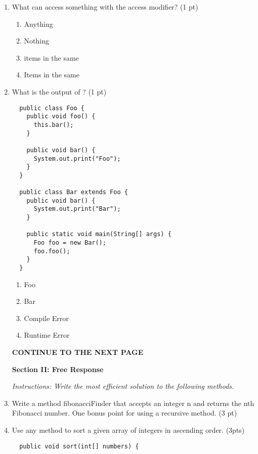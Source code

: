 \documentclass[11pt,fleqn]{article}
\begin{document}
\begin{enumerate}
\item What can access something with the  access modifier? (1 pt)
	\begin{enumerate}
	\item Anything
	\item Nothing
	\item items in the same 
	\item Items in the same  %
	\end{enumerate}

\item What is the output of ? (1 pt)
  \begin{verbatim}
  public class Foo {
    public void foo() {
      this.bar();
    }

    public void bar() {
      System.out.print("Foo");
    }
  }

  public class Bar extends Foo {
    public void bar() {
      System.out.print("Bar");
    }

    public static void main(String[] args) {
      Foo foo = new Bar();
      foo.foo();
    }
  }
  \end{verbatim}
	\begin{enumerate}
	\item Foo
	\item Bar
	\item Compile Error
	\item Runtime Error
	\end{enumerate}

  \vfill
  \begin{center}
  \textbf{CONTINUE TO THE NEXT PAGE}
  \end{center}

	\newpage

  \begin{center}
  \begin{large}
    \textbf{Section II: Free Response}
  \end{large}
  \end{center}
  \textit{Instructions: Write the most efficient solution to the following methods.}

\item Write a method fibonacciFinder that accepts an integer n and returns the nth Fibonacci number. One bonus point for using a recursive method. (3 pt)

\vspace{50ex}


\item Use any method to sort a given array of integers in ascending order. (3pts)
  \begin{verbatim}
  public void sort(int[] numbers) {












\end{verbatim}
\end{enumerate}
\end{document}
